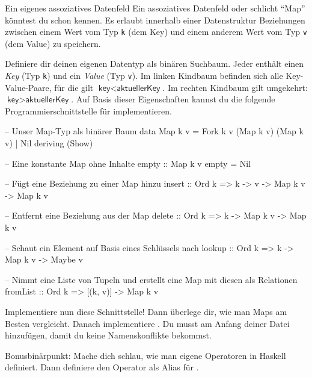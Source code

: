 \documentclass{uebblatt}
\begin{document}
\begin{aufgabe}{Ein eigenes assoziatives Datenfeld}
Ein assoziatives Datenfeld oder schlicht "`Map"' könntest du schon kennen. Es erlaubt innerhalb einer Datenstruktur Beziehungen zwischen einem Wert vom Typ \verb|k| (dem Key) und einem anderem Wert vom Typ \verb|v| (dem Value) zu speichern.

Definiere dir deinen eigenen Datentyp  als binären Suchbaum. Jeder  enthält einen \emph{Key} (Typ \verb|k|) und ein \emph{Value} (Typ \verb|v|). Im linken Kindbaum befinden sich alle Key-Value-Paare, für die gilt $\textsf{key} < \textsf{aktuellerKey}$. Im rechten Kindbaum gilt umgekehrt: $\textsf{key} > \textsf{aktuellerKey}$. Auf Basis dieser Eigenschaften kannst du die folgende Programmierschnittstelle für  implementieren.

\begin{haskellcode}
-- Unser Map-Typ als binärer Baum
data Map k v = Fork k v (Map k v) (Map k v)
             | Nil deriving (Show)

-- Eine konstante Map ohne Inhalte
empty :: Map k v
empty = Nil

-- Fügt eine Beziehung zu einer Map hinzu
insert :: Ord k => k -> v -> Map k v -> Map k v

-- Entfernt eine Beziehung aus der Map
delete :: Ord k => k -> Map k v -> Map k v

-- Schaut ein Element auf Basis eines Schlüssels nach
lookup :: Ord k => k -> Map k v -> Maybe v

-- Nimmt eine Liste von Tupeln und erstellt eine Map mit diesen als Relationen
fromList :: Ord k => [(k, v)] -> Map k v
\end{haskellcode}

Implementiere nun diese Schnittstelle! Dann überlege dir, wie man Maps am Besten vergleicht. Danach implementiere . Du musst  am Anfang deiner Datei hinzufügen, damit du keine Namenskonflikte bekommst.

Bonusbinärpunkt: Mache dich schlau, wie man eigene Operatoren in Haskell definiert. Dann definiere den Operator \haskellinline{!} als Alias für .
\end{aufgabe}
\end{document}
